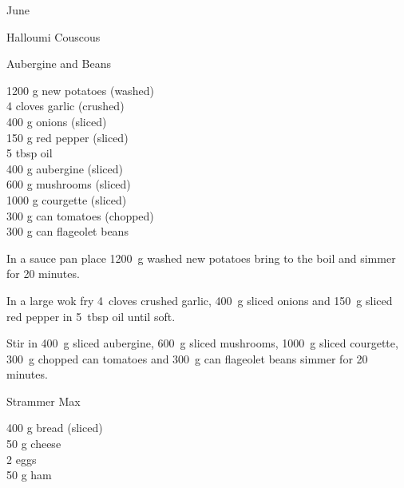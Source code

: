 \begin{menu}{June}
\begin{recipe}{2}{Halloumi Couscous}
\begin{instructions}
    \end{instructions}
    \end{recipe}%
  
    \begin{recipe}{2}{Aubergine and Beans}%
		\begin{ingredients}
		1200 g new potatoes (washed) \\
	4 cloves garlic (crushed) \\
	400 g onions (sliced) \\
	150 g red pepper (sliced) \\
	5 tbsp oil  \\
	400 g aubergine (sliced) \\
	600 g mushrooms (sliced) \\
	1000 g courgette (sliced) \\
	300 g can tomatoes (chopped) \\
	300 g can flageolet beans  \\
	
		\end{ingredients}
	
    \begin{instructions}
    \item 
      In a sauce pan place
      1200~g washed new potatoes
      bring to the boil and simmer for 20 minutes.
    \item 
        In a large wok fry
        4~cloves crushed garlic,
        400~g sliced onions
        and
        150~g sliced red pepper
        in
        5~tbsp  oil
        until soft.
      \item 
        Stir in
        400~g sliced aubergine,
        600~g sliced mushrooms,
        1000~g sliced courgette,
        300~g chopped can tomatoes
        and
        300~g  can flageolet beans
        simmer for 20 minutes.
      
    \end{instructions}
    \end{recipe}%
  
    \begin{recipe}{1}{Strammer Max}%
		\begin{ingredients}
		400 g bread (sliced) \\
	50 g cheese  \\
	2  eggs  \\
	50 g ham  \\
	
		\end{ingredients}
	

\end{recipe}
\end{menu}
